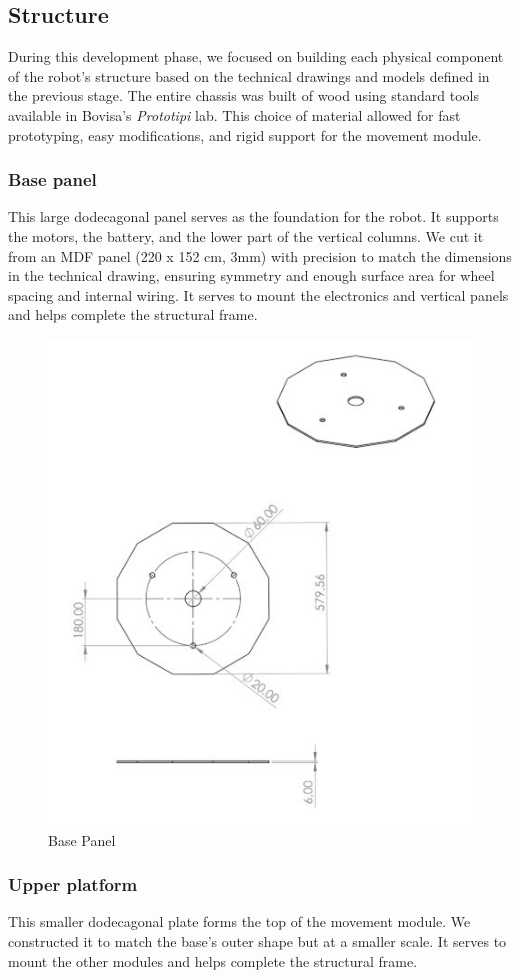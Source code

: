 \subsection{Structure}

During this development phase, we focused on building each physical component of the robot's structure based on the technical drawings and models defined in the previous stage. The entire chassis was built of wood using standard tools available in Bovisa's \textit{Prototipi} lab. This choice of material allowed for fast prototyping, easy modifications, and rigid support for the movement module.

\subsubsection{Base panel}
This large dodecagonal panel serves as the foundation for the robot. It supports the motors, the battery, and the lower part of the vertical columns. We cut it from an MDF panel (220 x 152 cm, 3mm) with precision to match the dimensions in the technical drawing, ensuring symmetry and enough surface area for wheel spacing and internal wiring. It serves to mount the electronics and vertical panels and helps complete the structural frame.

\begin{figure}[H]
    \centering
    \includegraphics[width=0.6\linewidth]{../ReportMovementModule/images/Aspose.Words.728084da-df58-4b9d-a372-f65cffbdb23d.018.jpeg}
    \caption{Base Panel}
\end{figure}

\subsubsection{Upper platform}
This smaller dodecagonal plate forms the top of the movement module. We constructed it to match the base's outer shape but at a smaller scale. It serves to mount the other modules and helps complete the structural frame.

